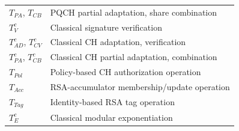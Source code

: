 \documentclass[lettersize,journal]{IEEEtran}
\begin{document}
\begin{table}[t]
\begin{tabular}{ll}
$T_{PA}$, $T_{CB}$ & PQCH partial adaptation, share combination \\
$T_V^{c}$ & Classical signature verification \\
$T_{AD}^{c}$, $T_{CV}^{c}$ & Classical CH adaptation, verification \\
$T_{PA}^{c}$, $T_{CB}^{c}$ & Classical CH partial adaptation, combination \\
$T_{Pol}$ & Policy-based CH authorization operation \\
$T_{Acc}$ & RSA-accumulator membership/update operation \\
$T_{Tag}$ & Identity-based RSA tag operation~\cite{ref13} \\
$T_E^{c}$ & Classical modular exponentiation \\
\hline
\end{tabular}
\end{table}
\end{document}
